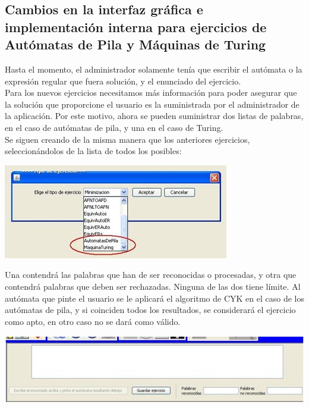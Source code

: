 \documentclass[12pt,a4paper,spanish]{book}
\begin{document}
\subsection{Cambios en la interfaz gr\'afica e implementaci\'on interna para ejercicios de Aut\'omatas de Pila y M\'aquinas de Turing}
Hasta el momento, el administrador solamente ten\'ia que escribir el aut\'omata o la expresi\'on regular que fuera soluci\'on, y el enunciado del ejercicio.\\ 
\newline
Para los nuevos ejercicios necesitamos m\'as informaci\'on para poder asegurar que la soluci\'on que proporcione el usuario es la suministrada por el administrador de la aplicaci\'on. Por este motivo, ahora se pueden suministrar dos listas de palabras, en el caso de aut\'omatas de pila, y una en el caso de Turing.\\
\newline
Se siguen creando de la misma manera que los anteriores ejercicios,\\ seleccion\'andolos de la lista de todos los posibles:\\
\begin{center}
\includegraphics{ejer1.jpg}
\end{center}
\newpage
Una contendr\'a las palabras que han de ser reconocidas o procesadas, y otra que contendr\'a palabras que deben ser rechazadas. Ninguna de las dos tiene l\'imite.  Al aut\'omata que pinte el usuario se le aplicar\'a el algoritmo de CYK en el caso de los aut\'omatas de pila, y si coinciden todos los resultados, se considerar\'a el ejercicio como apto, en otro caso no se dar\'a como v\'alido.\\
\begin{center}
\includegraphics{ejer2.jpg}
\end{center}
\end{document}
